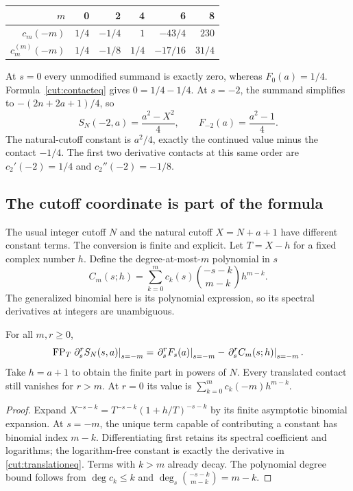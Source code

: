 \begin{center}
\begin{tabular}{@{}rrrrrr@{}}
\toprule
$m$&0&2&4&6&8\\
\midrule
$c_m(-m)$&$1/4$&$-1/4$&$1$&$-43/4$&$230$\\
$c_m^{(m)}(-m)$&$1/4$&$-1/8$&$1/4$&$-17/16$&$31/4$\\
\bottomrule
\end{tabular}
\end{center}

At $s=0$ every unmodified summand is exactly zero, whereas
$F_0(a)=1/4$. Formula~\eqref{cut:contacteq} gives $0=1/4-1/4$.
At $s=-2$, the summand simplifies to $-(2n+2a+1)/4$, so
\[
 S_N(-2,a)=\frac{a^2-X^2}{4},\qquad
 F_{-2}(a)=\frac{a^2-1}{4}.
\]
The natural-cutoff constant is $a^2/4$, exactly the continued value
minus the contact $-1/4$. The first two derivative contacts at this
same order are $c_2'(-2)=1/4$ and $c_2''(-2)=-1/8$.

\subsection{The cutoff coordinate is part of the formula}

The usual integer cutoff $N$ and the natural cutoff $X=N+a+1$ have
different constant terms. The conversion is finite and explicit.
Let $T=X-h$ for a fixed complex number $h$. Define the degree-at-most-$m$
polynomial in $s$
\begin{equation}\label{cut:translated}
 C_m(s;h)=\sum_{k=0}^{m}c_k(s)
                 \binom{-s-k}{m-k}h^{m-k}.
\end{equation}
The generalized binomial here is its polynomial expression, so its
spectral derivatives at integers are unambiguous.

\begin{corollary}\label{cut:translation}
For all $m,r\ge0$,
\begin{equation}\label{cut:translationeq}
 \operatorname{FP}_T\left.\partial_s^rS_N(s,a)\right|_{s=-m}
 =\left.\partial_s^rF_s(a)\right|_{s=-m}
  -\left.\partial_s^r C_m(s;h)\right|_{s=-m}.
\end{equation}
Take $h=a+1$ to obtain the finite part in powers of $N$.
Every translated contact still vanishes for $r>m$.
At $r=0$ its value is
$\sum_{k=0}^{m}c_k(-m)h^{m-k}$.
\end{corollary}
\begin{proof}
Expand $X^{-s-k}=T^{-s-k}(1+h/T)^{-s-k}$ by its finite asymptotic
binomial expansion. At $s=-m$, the unique term capable of contributing
a constant has binomial index $m-k$. Differentiating first retains its
spectral coefficient and logarithms; the logarithm-free constant is
exactly the derivative in \eqref{cut:translationeq}. Terms with $k>m$
already decay. The polynomial degree bound follows from
$\deg c_k\le k$ and
$\deg_s\binom{-s-k}{m-k}=m-k$.
\end{proof}

